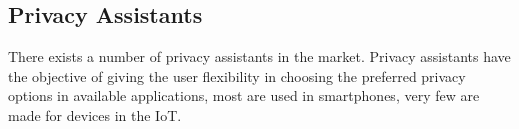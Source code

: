 

\subsection{Privacy Assistants}

There exists a number of privacy assistants in the market. Privacy assistants
have the objective of giving the user flexibility in choosing the preferred
privacy options in available applications, most are used in smartphones,
very few are made for devices in the IoT.

